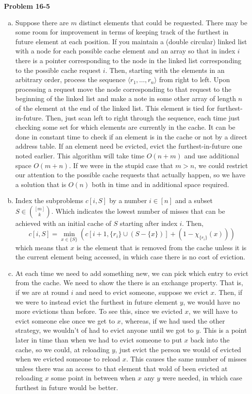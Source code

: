 \documentclass{article}
\begin{document}
\noindent\textbf{Problem 16-5}\\
\begin{enumerate}[a.]
\item
Suppose there are $m$ distinct elements that could be requested. There may be some room for improvement in terms of keeping track of the furthest in future element at each position. If you maintain a (double circular) linked list with a node for each possible cache element and an array so that in index $i$ there is a pointer corresponding to the node in the linked list corresponding to the possible cache request $i$. Then, starting with the elements in an arbitrary order, process the sequence $\langle r_1,\ldots, r_n\rangle$ from right to left. Upon processing a request move the node corresponding to that request to the beginning of the linked list and make a note in some other array of length $n$ of the element at the end of the linked list. This element is tied for furthest-in-future. Then, just scan left to right through the sequence, each time just checking some set for which elements are currently in the cache. It can be done in constant time to check if an element is in the cache or not by a direct address table. If an element need be evicted, evict the furthest-in-future one noted earlier. This algorithm will take time $O(n+m)$ and use additional space $O(m+n)$. If we were in the stupid case that $m>n$, we could restrict our attention to the possible cache requests that actually happen, so we have a solution that is $O(n)$ both in time and in additional space required.

\item
Index the subproblems $c[i,S]$ by a number $i\in [n]$ and a subset $S \in \binom{[m]}{k}$. Which indicates the lowest number of misses that can be achieved with an initial cache of $S$ starting after index $i$. Then, 
\[
c[i,S] = \min_{x\in\{S\}} (c[i+1,\{r_i\}\cup(S-\{x\})] + (1-\chi_{\{r_i\}}(x)) )
\]
which means that $x$ is the element that is removed from the cache unless it is the current element being accessed, in which case there is no cost of eviction.

\item
At each time we need to add something new, we can pick which entry to evict from the cache. We need to show the there is an exchange property. That is, if we are at round $i$ and need to evict someone, suppose we evict $x$. Then, if we were to instead evict the furthest in future element $y$, we would have no more evictions than before. To see this, since we evicted $x$, we will have to evict someone else once we get to $x$, whereas, if we had used the other strategy, we wouldn't of had to evict anyone until we got to $y$. This is a point later in time than when we had to evict someone to put $x$ back into the cache, so we could, at reloading $y$, just evict the person we would of evicted when we evicted someone to reload $x$. This causes the same number of misses unless there was an access to that element that wold of been evicted at reloading $x$ some point in between when $x$ any $y$ were needed, in which case furthest in future would be better.

\end{enumerate}
\end{document}

